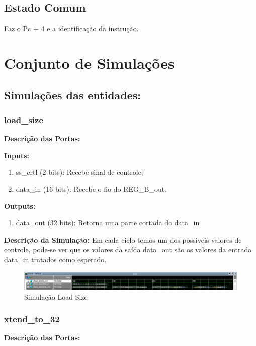 \subsection{Estado Comum}
 
Faz o Pc + 4 e a identificação da instrução.

\newpage

\section{Conjunto de Simulações}

\subsection{Simulações das entidades: }
\subsubsection{load\_size}
\textbf{Descrição das Portas:}

\textbf{Inputs:}

\begin{enumerate}
    \item ss\_crtl (2 bits): Recebe sinal de controle;
    \item data\_in (16 bits): Recebe o fio do REG\_B\_out.

\end{enumerate}

\textbf{Outputs:}

\begin{enumerate}
    \item data\_out (32 bits): Retorna uma parte cortada do data\_in
\end{enumerate}

\textbf{Descrição da Simulação:} Em cada ciclo temos um dos possiveis valores de controle, pode-se ver que os valores da saída data\_out são os valores da entrada data\_in tratados como esperado.

\begin{figure}[htbp!]
\centering
\includegraphics[width=1\textwidth]{figure/simulacao_load_size.png}
\caption{Simulação Load Size} 
\label{fig:imagem_massa}
\end{figure}

\subsubsection{xtend\_to\_32}
\textbf{Descrição das Portas:}

